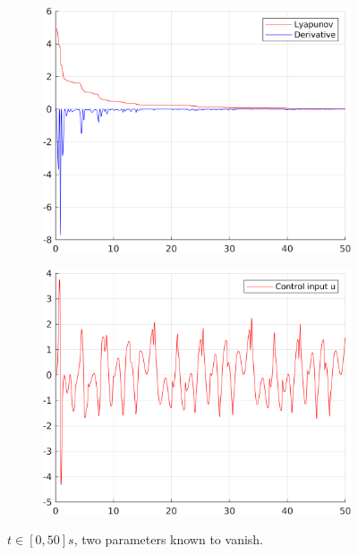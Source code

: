 \documentclass[12pt,a4paper]{article}
\begin{document}
\begin{figure}[H]
\begin{subfigure}{.45\textwidth}
			\includegraphics[width=1\textwidth]{Graphics/NonLinearLyapunovZero3.png}
		\end{subfigure}%
		\begin{subfigure}{.45\textwidth}
			\centering
			\includegraphics[width=1\textwidth]{Graphics/NonLinearControlZero3.png}
		\end{subfigure}
		\caption{$t \in [0,50]s$, two parameters known to vanish.}
	\end{figure}
	
	
\end{document}
